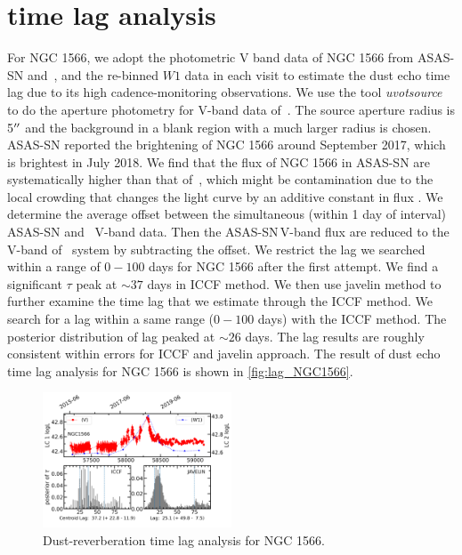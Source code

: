 \section{time lag analysis} \label{lag_analysis}
For NGC 1566, we adopt the photometric V band data of NGC 1566 from ASAS-SN and \uvot\,, and the re-binned $W1$ data in each visit to estimate the dust echo time lag due to its high cadence-monitoring observations. We use the tool \textit{uvotsource} to do the aperture photometry for V-band data of \uvot\,. The source aperture radius is 5$\mbox{$^{\prime\prime}$}$ and the background in a blank region with a much larger radius is chosen. ASAS-SN \citep[][]{2018ATel11893....1D} reported the brightening of NGC 1566 around September 2017, which is brightest in July 2018. We find that the flux of NGC 1566 in ASAS-SN are systematically higher than that of \uvot\,, which might be contamination due to the local crowding that changes the light curve by an additive constant in flux   \citep[see ][]{2017PASP..129j4502K}. We determine the average offset between the simultaneous (within 1 day of interval) ASAS-SN and \uvot\, V-band data. Then the ASAS-SN\,V-band flux are reduced to the V-band of \uvot\, system by subtracting the offset. We restrict the lag we searched within a range of $0-100$ days for NGC 1566 after the first attempt. We find a significant $\tau$ peak at $\sim 37$ days in ICCF method. We then use {\sc javelin} method to further examine the time lag that we estimate through the ICCF method. We search for a lag within a same range ($0-100$ days) with the ICCF method. The posterior distribution of lag peaked at $\sim 26$ days. The lag results are roughly consistent within errors for ICCF and {\sc javelin} approach. The result of dust echo time lag analysis for NGC 1566 is shown in \autoref{fig:lag_NGC1566}. 
\begin{figure}[h!]
\centering
	\includegraphics[width=0.5\textwidth]{pic/NGC1566_lag.png}
    \caption{Dust-reverberation time lag analysis for NGC 1566. }
    \label{fig:lag_NGC1566}
\end{figure}

